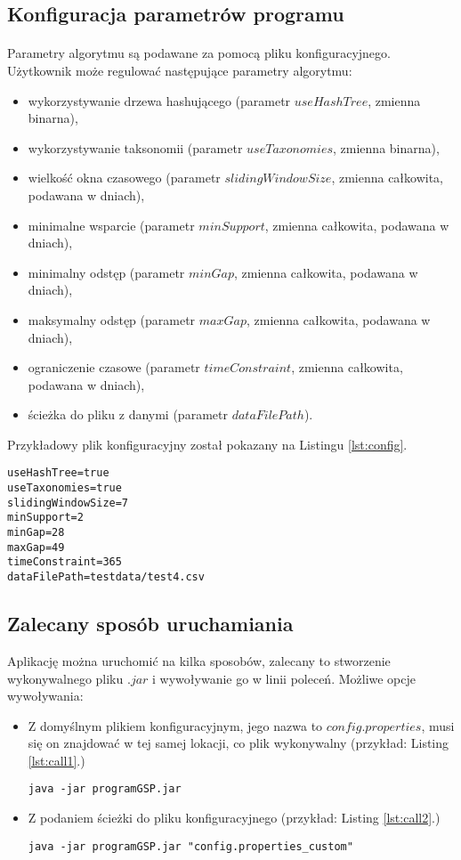 \documentclass[11pt,a4paper]{article}
\begin{document}
\subsection{Konfiguracja parametrów programu}
\label{subsec:Param}
\paragraph{} Parametry algorytmu są podawane za pomocą pliku konfiguracyjnego. Użytkownik może regulować następujące parametry algorytmu:
\begin{itemize}
\item wykorzystywanie drzewa hashującego (parametr $useHashTree$, zmienna binarna),
\item wykorzystywanie taksonomii (parametr $useTaxonomies$, zmienna binarna),
\item wielkość okna czasowego (parametr $slidingWindowSize$, zmienna całkowita, podawana w dniach),
\item minimalne wsparcie (parametr $minSupport$, zmienna całkowita, podawana w dniach),
\item minimalny odstęp (parametr $minGap$, zmienna całkowita, podawana w dniach),
\item maksymalny odstęp (parametr $maxGap$, zmienna całkowita, podawana w dniach),
\item ograniczenie czasowe (parametr $timeConstraint$, zmienna całkowita, podawana w dniach),
\item ścieżka do pliku z danymi (parametr $dataFilePath$).
\end{itemize}
Przykładowy plik konfiguracyjny został pokazany na Listingu \ref{lst:config}.
\begin{lstlisting}[caption={Przykładowy plik konfiguracyjny},label={lst:config}]
useHashTree=true
useTaxonomies=true
slidingWindowSize=7
minSupport=2
minGap=28
maxGap=49
timeConstraint=365
dataFilePath=testdata/test4.csv
\end{lstlisting}
\subsection{Zalecany sposób uruchamiania}
Aplikację można uruchomić na kilka sposobów, zalecany to stworzenie wykonywalnego pliku $.jar$ i wywoływanie go w linii poleceń. Możliwe opcje wywoływania:
\begin{itemize}
\item Z domyślnym plikiem konfiguracyjnym, jego nazwa to $config.properties$, musi się on znajdować w tej samej lokacji, co plik wykonywalny (przykład: Listing \ref{lst:call1}.)
\begin{lstlisting}[caption={Wywołanie dla domyślnego pliku konfiguracyjnego},label={lst:call1}]
java -jar programGSP.jar
\end{lstlisting}
\item Z podaniem ścieżki do pliku konfiguracyjnego (przykład: Listing \ref{lst:call2}.)
\begin{lstlisting}[caption={Wywołanie ze specyfikacją pliku konfiguracyjnego},label={lst:call2}]
java -jar programGSP.jar "config.properties_custom"
\end{lstlisting}
\end{itemize}
\end{document}
